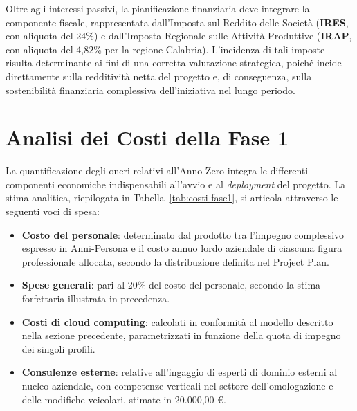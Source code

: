 Oltre agli interessi passivi, la pianificazione finanziaria deve integrare la componente fiscale, rappresentata dall'Imposta sul Reddito delle Societ\`a (\textbf{IRES}, con aliquota del 24\%) e dall'Imposta Regionale sulle Attivit\`a Produttive (\textbf{IRAP}, con aliquota del 4,82\% per la regione Calabria). L'incidenza di tali imposte risulta determinante ai fini di una corretta valutazione strategica, poich\'e incide direttamente sulla redditivit\`a netta del progetto e, di conseguenza, sulla sostenibilit\`a finanziaria complessiva dell'iniziativa nel lungo periodo.

\section{Analisi dei Costi della Fase 1}

La quantificazione degli oneri relativi all'Anno Zero integra le differenti componenti economiche indispensabili all'avvio e al \textit{deployment} del progetto. La stima analitica, riepilogata in Tabella~\ref{tab:costi-fase1}, si articola attraverso le seguenti voci di spesa:

\begin{itemize}
    \item \textbf{Costo del personale}: determinato dal prodotto tra l'impegno complessivo espresso in Anni-Persona e il costo annuo lordo aziendale di ciascuna figura professionale allocata, secondo la distribuzione definita nel Project Plan.
    \item \textbf{Spese generali}: pari al 20\% del costo del personale, secondo la stima forfettaria illustrata in precedenza.
    \item \textbf{Costi di cloud computing}: calcolati in conformit\`a al modello descritto nella sezione precedente, parametrizzati in funzione della quota di impegno dei singoli profili.
    \item \textbf{Consulenze esterne}: relative all'ingaggio di esperti di dominio esterni al nucleo aziendale, con competenze verticali nel settore dell'omologazione e delle modifiche veicolari, stimate in 20.000,00 \euro{}.
\end{itemize}

